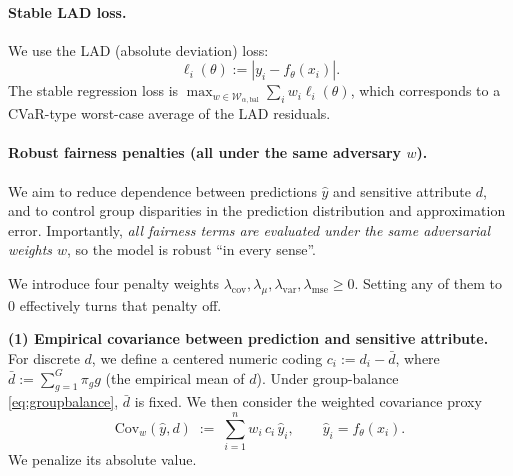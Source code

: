 \documentclass{article}
\begin{document}

\paragraph{Stable LAD loss.}
We use the LAD (absolute deviation) loss:
\[
\ell_i(\theta) := |y_i - f_\theta(x_i)|.
\]
The stable regression loss is $\max_{w\in\mathcal{W}_{\alpha,\mathrm{bal}}}\sum_i w_i\ell_i(\theta)$,
which corresponds to a CVaR-type worst-case average of the LAD residuals.

\paragraph{Robust fairness penalties (all under the same adversary $w$).}
We aim to reduce dependence between predictions $\hat y$ and sensitive attribute $d$, and to control
group disparities in the prediction distribution and approximation error. Importantly,
\emph{all fairness terms are evaluated under the same adversarial weights $w$}, so the model is robust
``in every sense''.

We introduce four penalty weights
$\lambda_{\mathrm{cov}},\lambda_{\mu},\lambda_{\mathrm{var}},\lambda_{\mathrm{mse}}\ge 0$.
Setting any of them to $0$ effectively turns that penalty off.

\vspace{2mm}
\noindent\textbf{(1) Empirical covariance between prediction and sensitive attribute.}
For discrete $d$, we define a centered numeric coding $c_i:=d_i-\bar d$, where $\bar d:=\sum_{g=1}^G \pi_g g$
(the empirical mean of $d$). Under group-balance \eqref{eq:groupbalance}, $\bar d$ is fixed.
We then consider the weighted covariance proxy
\[
\mathrm{Cov}_w(\hat y,d) \;:=\; \sum_{i=1}^n w_i\,c_i\,\hat y_i,
\qquad \hat y_i=f_\theta(x_i).
\]
We penalize its absolute value.
\end{document}
